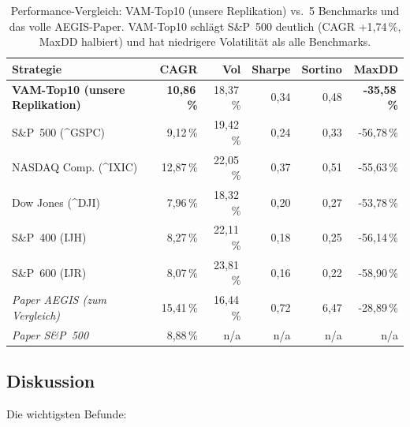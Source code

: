 \begin{table}[ht]
\centering
\small
\begin{tabular}{lrrrrr}
  \toprule
  \textbf{Strategie} & \textbf{CAGR} & \textbf{Vol} & \textbf{Sharpe} & \textbf{Sortino} & \textbf{MaxDD} \\
  \midrule
  \textbf{VAM-Top10 (unsere Replikation)} & \textbf{10{,}86\,\%} & 18{,}37\,\% & 0{,}34 & 0{,}48 & \textbf{-35{,}58\,\%} \\
  S\&P~500 (\^{}GSPC)        & 9{,}12\,\%  & 19{,}42\,\% & 0{,}24 & 0{,}33 & -56{,}78\,\% \\
  NASDAQ Comp. (\^{}IXIC)   & 12{,}87\,\% & 22{,}05\,\% & 0{,}37 & 0{,}51 & -55{,}63\,\% \\
  Dow Jones (\^{}DJI)        & 7{,}96\,\%  & 18{,}32\,\% & 0{,}20 & 0{,}27 & -53{,}78\,\% \\
  S\&P~400 (IJH)            & 8{,}27\,\%  & 22{,}11\,\% & 0{,}18 & 0{,}25 & -56{,}14\,\% \\
  S\&P~600 (IJR)            & 8{,}07\,\%  & 23{,}81\,\% & 0{,}16 & 0{,}22 & -58{,}90\,\% \\
  \midrule
  \emph{Paper AEGIS (zum Vergleich)} & 15{,}41\,\% & 16{,}44\,\% & 0{,}72 & 6{,}47 & -28{,}89\,\% \\
  \emph{Paper S\&P~500}              & 8{,}88\,\%  & n/a       & n/a  & n/a  & n/a       \\
  \bottomrule
\end{tabular}
\caption{Performance-Vergleich: VAM-Top10 (unsere Replikation) vs.\ 5
  Benchmarks und das volle AEGIS-Paper. VAM-Top10 schlägt S\&P~500
  deutlich (CAGR +1{,}74\,\%, MaxDD halbiert) und hat niedrigere
  Volatilität als alle Benchmarks.}
\label{tab:results}
\end{table}

\subsection{Diskussion}

Die wichtigsten Befunde:

